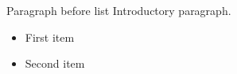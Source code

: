 \documentclass[14pt,t]{beamer-accessibility}
\begin{document}
\begin{frame}{Paragraph before list}
Introductory paragraph.

\begin{itemize}
\item First item
\item Second item
\end{itemize}
\end{frame}
\end{document}
